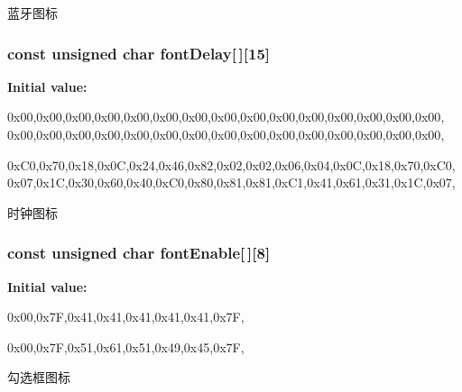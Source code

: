 蓝牙图标 

\hypertarget{group___w_i_d_g_e_t_ga4281d2c990312a449f8115a73da5d4b6}{
\subsubsection[{font\-Delay}]{\setlength{\rightskip}{0pt plus 5cm}const unsigned char {\bf font\-Delay}\mbox{[}$\,$\mbox{]}\mbox{[}15\mbox{]}}}\label{group___w_i_d_g_e_t_ga4281d2c990312a449f8115a73da5d4b6}
{\bfseries \-Initial value\-:}
\begin{DoxyCode}
 
{

{0x00,0x00,0x00,0x00,0x00,0x00,0x00,0x00,0x00,0x00,0x00,0x00,0x00,0x00,0x00},
{0x00,0x00,0x00,0x00,0x00,0x00,0x00,0x00,0x00,0x00,0x00,0x00,0x00,0x00,0x00},

{0xC0,0x70,0x18,0x0C,0x24,0x46,0x82,0x02,0x02,0x06,0x04,0x0C,0x18,0x70,0xC0},
{0x07,0x1C,0x30,0x60,0x40,0xC0,0x80,0x81,0x81,0xC1,0x41,0x61,0x31,0x1C,0x07},
}
\end{DoxyCode}


时钟图标 

\hypertarget{group___w_i_d_g_e_t_ga7ef23e7312ba1eef34a75bae365cf3e3}{
\subsubsection[{font\-Enable}]{\setlength{\rightskip}{0pt plus 5cm}const unsigned char {\bf font\-Enable}\mbox{[}$\,$\mbox{]}\mbox{[}8\mbox{]}}}\label{group___w_i_d_g_e_t_ga7ef23e7312ba1eef34a75bae365cf3e3}
{\bfseries \-Initial value\-:}
\begin{DoxyCode}

{
{0x00,0x7F,0x41,0x41,0x41,0x41,0x41,0x7F},

{0x00,0x7F,0x51,0x61,0x51,0x49,0x45,0x7F},

}
\end{DoxyCode}


勾选框图标 

